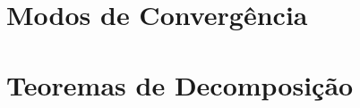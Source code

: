 \functionInftySeminorm










\section{Modos de Convergência}










\section{Teoremas de Decomposição}